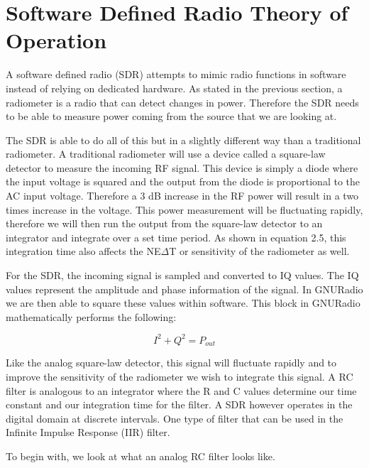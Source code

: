 \section{Software Defined Radio Theory of Operation}

A software defined radio (SDR) attempts to mimic radio functions in software instead of relying on dedicated hardware.  As stated in the previous section, a radiometer is a radio that can detect changes in power.  Therefore the SDR needs to be able to measure power coming from the source that we are looking at.  

The SDR is able to do all of this but in a slightly different way than a traditional radiometer.  A traditional radiometer will use a device called a square-law detector to measure the incoming RF signal.  This device is simply a diode where the input voltage is squared and the output from the diode is proportional to the AC input voltage.  Therefore a 3 dB increase in the RF power will result in a two times increase in the voltage.  This power measurement will be fluctuating rapidly, therefore we will then run the output from the square-law detector to an integrator and integrate over a set time period.  As shown in equation 2.5, this integration time also affects the NE$\Delta$T or sensitivity of the radiometer as well.

For the SDR, the incoming signal is sampled and converted to IQ values.  The IQ values represent the amplitude and phase information of the signal.  In GNURadio we are then able to square these values within software.  This block in GNURadio mathematically performs the following:

\begin{equation}
I^2+Q^2 = P_{out}
\end{equation}

Like the analog square-law detector, this signal will fluctuate rapidly and to improve the sensitivity of the radiometer we wish to integrate this signal.  A RC filter is analogous to an integrator where the R and C values determine our time constant and our integration time for the filter.  A SDR however operates in the digital domain at discrete intervals.  One type of filter that can be used in the Infinite Impulse Response (IIR) filter. 

To begin with, we look at what an analog RC filter looks like. 

